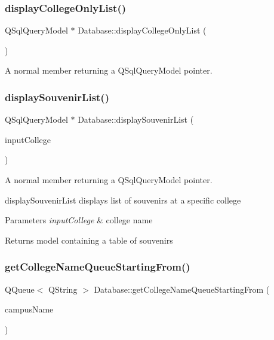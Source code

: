 \subsubsection{\texorpdfstring{display\+College\+Only\+List()}{displayCollegeOnlyList()}}
{\footnotesize\ttfamily Q\+Sql\+Query\+Model $\ast$ Database\+::display\+College\+Only\+List (\begin{DoxyParamCaption}{ }\end{DoxyParamCaption})}



A normal member returning a Q\+Sql\+Query\+Model pointer. 

\mbox{\label{class_database_ad4a7631de5e445a2e8668ccbb2e7639c}} 
\subsubsection{\texorpdfstring{display\+Souvenir\+List()}{displaySouvenirList()}}
{\footnotesize\ttfamily Q\+Sql\+Query\+Model $\ast$ Database\+::display\+Souvenir\+List (\begin{DoxyParamCaption}\item[{Q\+String}]{input\+College }\end{DoxyParamCaption})}



A normal member returning a Q\+Sql\+Query\+Model pointer. 

display\+Souvenir\+List displays list of souvenirs at a specific college 
\begin{DoxyParams}{Parameters}
{\em input\+College} & college name \\
\hline
\end{DoxyParams}
\begin{DoxyReturn}{Returns}
model containing a table of souvenirs 
\end{DoxyReturn}
\mbox{\label{class_database_a716dc593105e4e15cd7e0834d4d1d82a}} 
\subsubsection{\texorpdfstring{get\+College\+Name\+Queue\+Starting\+From()}{getCollegeNameQueueStartingFrom()}}
{\footnotesize\ttfamily Q\+Queue$<$ Q\+String $>$ Database\+::get\+College\+Name\+Queue\+Starting\+From (\begin{DoxyParamCaption}\item[{Q\+String}]{campus\+Name }\end{DoxyParamCaption})}



